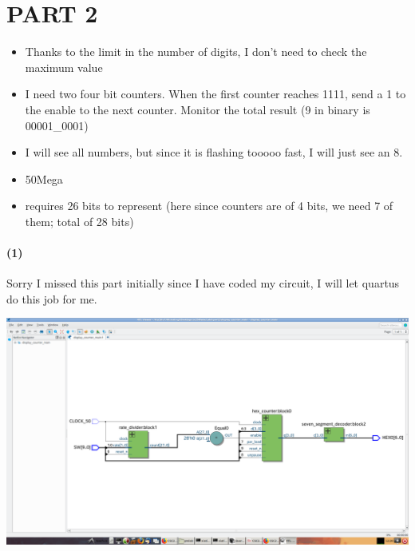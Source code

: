 \documentclass{article}
\begin{document}
\section*{PART 2}
\begin{itemize}
    \item Thanks to the limit in the number of digits, I don't need to check the maximum value
    \item I need two four bit counters. When the first counter reaches 1111, send a 1 to the enable to the next counter. Monitor the total result (9 in binary is 00001\_0001)
    \item I will see all numbers, but since it is flashing tooooo fast, I will just see an 8.
    \item 50Mega 
    \item requires 26 bits to represent (here since counters are of 4 bits, we need 7 of them; total of 28 bits)
\end{itemize}

\paragraph{(1)} Sorry I missed this part initially since I have coded my circuit, I will let quartus do this job for me. 
\begin{center}
    \includegraphics[scale=0.25]{part2_q1.png}
\end{center}
\end{document}
